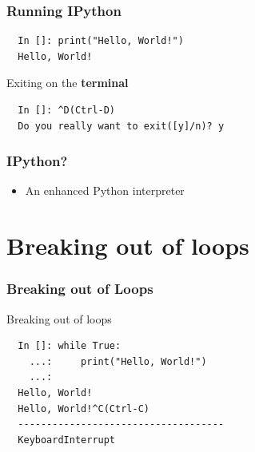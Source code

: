 \documentclass[14pt,compress]{beamer}
\begin{document}



\begin{frame}[fragile]
\frametitle{Running IPython}
\begin{lstlisting}
  In []: print("Hello, World!")
  Hello, World!
\end{lstlisting}

Exiting on the \textbf{terminal}
\begin{lstlisting}
  In []: ^D(Ctrl-D)
  Do you really want to exit([y]/n)? y
\end{lstlisting}
\end{frame}

\begin{frame}[fragile]
  \frametitle{IPython? }
  \begin{itemize}
  \item An enhanced Python interpreter
  \end{itemize}
\end{frame}



\section{Breaking out of loops}
\begin{frame}[fragile]
\frametitle{Breaking out of Loops}
Breaking out of loops
\begin{lstlisting}
  In []: while True:
    ...:     print("Hello, World!")
    ...:
  Hello, World!
  Hello, World!^C(Ctrl-C)
  ------------------------------------
  KeyboardInterrupt
\end{lstlisting}
\end{frame}
\end{document}
